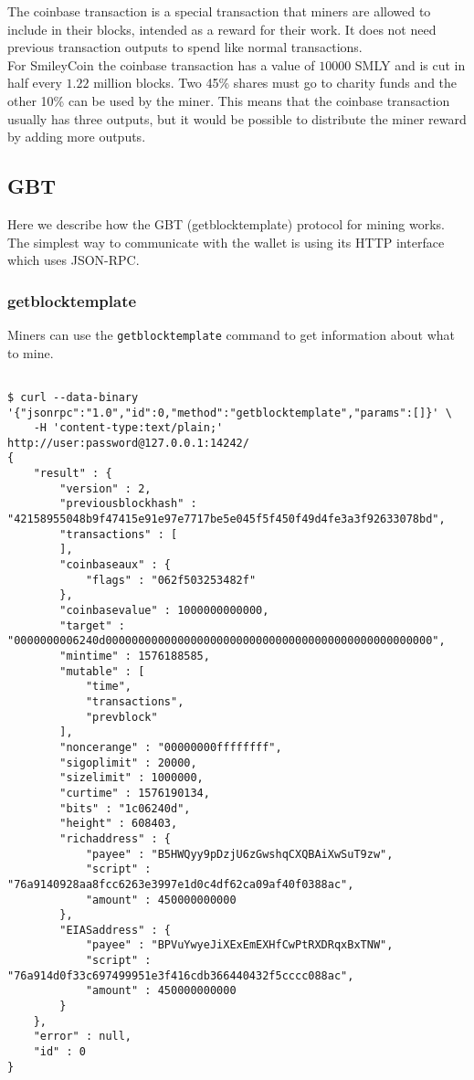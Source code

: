 The coinbase transaction is a special transaction that miners are allowed to include in their blocks, intended as a reward for their work. It does not need previous transaction outputs to spend like normal transactions. \\

For SmileyCoin the coinbase transaction has a value of $10000$ SMLY and is cut in half every $1.22$ million blocks. Two 45\% shares must go to charity funds and the other 10\% can be used by the miner. This means that the coinbase transaction usually has three outputs, but it would be possible to distribute the miner reward by adding more outputs.

\subsection{GBT}

Here we describe how the GBT (getblocktemplate) protocol for mining works. The simplest way to communicate with the wallet is using its HTTP interface which uses JSON-RPC.

\subsubsection{getblocktemplate}

Miners can use the \texttt{getblocktemplate} command to get information about what to mine. 

\begin{verbatim}

$ curl --data-binary '{"jsonrpc":"1.0","id":0,"method":"getblocktemplate","params":[]}' \ 
    -H 'content-type:text/plain;' http://user:password@127.0.0.1:14242/
{
    "result" : {
        "version" : 2,
        "previousblockhash" : "42158955048b9f47415e91e97e7717be5e045f5f450f49d4fe3a3f92633078bd",
        "transactions" : [
        ],
        "coinbaseaux" : {
            "flags" : "062f503253482f"
        },
        "coinbasevalue" : 1000000000000,
        "target" : "0000000006240d00000000000000000000000000000000000000000000000000",
        "mintime" : 1576188585,
        "mutable" : [
            "time",
            "transactions",
            "prevblock"
        ],
        "noncerange" : "00000000ffffffff",
        "sigoplimit" : 20000,
        "sizelimit" : 1000000,
        "curtime" : 1576190134,
        "bits" : "1c06240d",
        "height" : 608403,
        "richaddress" : {
            "payee" : "B5HWQyy9pDzjU6zGwshqCXQBAiXwSuT9zw",
            "script" : "76a9140928aa8fcc6263e3997e1d0c4df62ca09af40f0388ac",
            "amount" : 450000000000
        },
        "EIASaddress" : {
            "payee" : "BPVuYwyeJiXExEmEXHfCwPtRXDRqxBxTNW",
            "script" : "76a914d0f33c697499951e3f416cdb366440432f5cccc088ac",
            "amount" : 450000000000
        }
    },
    "error" : null,
    "id" : 0
}
\end{verbatim}

